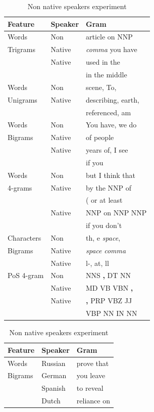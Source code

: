 \documentclass[10pt,a5paper,twoside]{article}
\begin{document}
\begin{table}[t]
  \begin{subtable}[]{0.5\textwidth}
    \begin{tabular}{l|ll|}
     \textbf{Feature} & \textbf{Speaker}  & \textbf{Gram}
     \\\hline
     Words & Non&article on NNP\\
     Trigrams& Native&  \emph{comma} you have\\\cline{2-3}
             & Native& used in the\\
             &  &in the middle\\\hline
       Words &Non& scene, To,\\
     Unigrams&Native&describing, earth,\\\cline{2-3}
             && referenced, am\\\hline
      Words  &Non& You have, we do\\
      Bigrams&Native& of people\\\cline{2-3}
             &Native& years of, I see\\
             &&if you\\\hline
       Words &Non& but I think that\\
     4-grams  &Native&by the NNP of\\\cline{2-3}
              &&( or at least\\
              &Native&NNP on NNP NNP\\
              &&if you don't\\\hline
    Characters&Non& th, e \emph{space},\\
         Bigrams &Native& \emph{space} \emph{comma}\\ \cline{2-3}
                 &Native& l-, at, ll\\\hline
      PoS 4-gram &Non& NNS \textbf{,} DT NN\\
                 &Native& MD VB VBN \textbf{,}\\\cline{2-3}
                 &Native& \textbf{,} PRP VBZ JJ\\
                 && VBP NN IN NN\\
      \end{tabular}
    \label{table:nonnative}
    \caption{Non native speakers experiment}
  \end{subtable}
  \begin{subtable}[]{0.5\textwidth}
   \begin{tabular}{l|ll}
    \textbf{Feature} & \textbf{Speaker}  & \textbf{Gram}
   \\\hline
   Words & Russian &prove that\\
    Bigrams& German& you leave\\
    & Spanish& to reveal\\
    & Dutch & reliance on\\\hline


\end{tabular}
\end{subtable}
\end{table}
\end{document}
